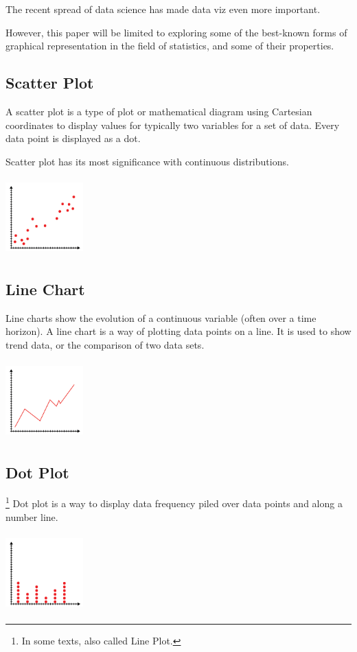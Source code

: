 \documentclass{article}
\begin{document}
The recent spread of data science has made data viz even more important.

However, this paper will be limited to exploring some of the best-known forms of graphical representation in the field of statistics, and some of their properties.

\subsection{Scatter Plot}
A scatter plot is a type of plot or mathematical diagram using Cartesian coordinates to display values for typically two variables for a set of data. Every data point is displayed as a dot.

Scatter plot has its most significance with continuous distributions. 

\includegraphics[width=3cm, height=3cm]{plot_chart}

\subsection{Line Chart}
Line charts show the evolution of a continuous variable (often over a time horizon).
A line chart is a way of plotting data points on a line. 
It is used to show trend data, or the comparison of two data sets.

\includegraphics[width=3cm, height=3cm]{line_chart}

\subsection{Dot Plot}\footnote{In some texts, also called Line Plot.}
Dot plot is a way to display data frequency piled over data points and along a number line. 

\includegraphics[width=3cm, height=3cm]{dot_plot}
\end{document}
